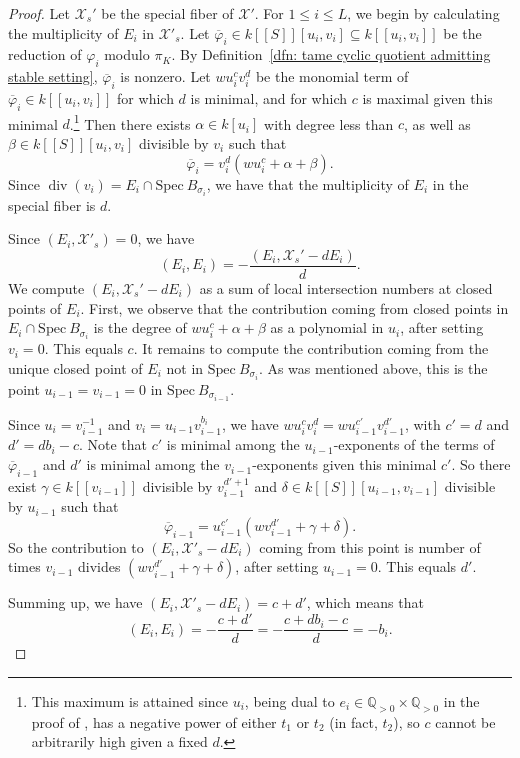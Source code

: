 \documentclass[12pt]{amsart}
\numberwithin{equation}{section}
\theoremstyle{definition}
\newcommand{\ol}[1]{\overline{#1}}
\newcommand{\mc}[1]{\mathcal{#1}}
\newcommand{\rats}{\mathbb Q}
\renewcommand{\phi}{\varphi}
\newcommand{\Spec}{\mathrm{Spec} \ }
\DeclareMathOperator{\divi}{div}
\begin{document}
\begin{proof}
Let $\mc{X}_s'$ be the special fiber of $\mc{X}'$.  For
  $1 \leq i \leq L$, we begin by calculating the multiplicity of $E_i$ in
  $\mc{X}'_s$.  Let $\ol{\phi}_i \in k[[S]][u_i, v_i] \subseteq
  k[[u_i, v_i]]$ be the
  reduction of $\phi_i$ modulo $\pi_K$. By Definition~\ref{dfn: tame
    cyclic quotient admitting stable setting}, $\ol{\phi}_i$ is nonzero.  Let $wu_i^cv_i^d$ be the monomial
term of $\ol{\phi}_i \in k[[u_i, v_i]]$ for which
$d$ is minimal, and for which $c$ is maximal given this minimal $d$.\footnote{This
  maximum is attained since $u_i$, being dual to $e_i \in \rats_{>0}
  \times \rats_{>0}$ in the proof of
  \cite[Proposition 4.4.2.5]{HN}, has a negative power of either $t_1$
  or $t_2$ (in fact, $t_2$), so
 $c$ cannot be arbitrarily high given a fixed $d$.} Then there exists $\alpha \in
k[u_i]$ with degree less than $c$, as well as $\beta \in
k[[S]][u_i, v_i]$ divisible by $v_i$ 
such that 
$$\ol{\phi}_i = v_i^d(wu_i^c + \alpha + \beta).$$
Since
$\divi(v_i) = E_i \cap \Spec B_{\sigma_i}$, we have that the
multiplicity of $E_i$ in the special fiber is $d$.

Since $(E_i, \mc{X}'_s) = 0$, we have
$$(E_i, E_i) = -\frac{(E_i, \mc{X}_s' - dE_i)}{d}.$$  
We compute $(E_i, \mc{X}_s' - dE_i)$ as a sum of local intersection
numbers at closed points of $E_i$.  First, we observe that the contribution 
coming from closed points in $E_i \cap \Spec B_{\sigma_i}$ is the degree of $wu_i^c + \alpha + \beta$ as a polynomial in
  $u_i$, after setting $v_i = 0$.  This equals $c$.  It remains to
  compute the contribution coming from the unique closed point of
  $E_i$ not in $\Spec B_{\sigma_i}$.  As was mentioned above, this is
  the point $u_{i-1} = v_{i-1} = 0$
  in $\Spec B_{\sigma_{i-1}}$.

Since  $u_i
= v_{i-1}^{-1}$ and $v_i = u_{i-1}v_{i-1}^{b_i}$, we have
$wu_i^cv_i^d = wu_{i-1}^{c'}v_{i-1}^{d'}$, with $c' = d$ 
and $d' = db_i - c$.
Note that $c'$ is minimal among the $u_{i-1}$-exponents of the terms
of $\ol{\phi}_{i-1}$  and $d'$ is minimal among the
$v_{i-1}$-exponents given this minimal $c'$.  So there exist $\gamma \in k[[v_{i-1}]]$ divisible by $v_{i-1}^{d' +1}$ and $\delta \in
k[[S]][u_{i-1}, v_{i-1}]$ divisible by $u_{i-1}$ such that 
$$\ol{\phi}_{i-1} = u_{i-1}^{c'}(wv_{i-1}^{d'} + \gamma +
\delta).$$  So the contribution to $(E_i,
\mc{X}'_s - dE_i)$ coming
from this point is number of times $v_{i-1}$ divides $(wv_{i-1}^{d'} + \gamma +
\delta)$, after setting $u_{i-1} = 0$.  This equals $d'$.

Summing up, we have $(E_i, \mc{X}'_s - dE_i) = c +
d'$, which means that 
$$(E_i, E_i) = -\frac{c+d'}{d} = -\frac{c + db_i - c}{d} = -b_i. $$
\end{proof}
\end{document}
